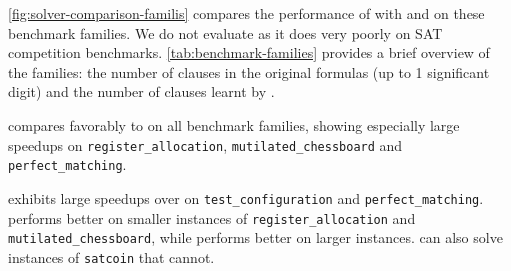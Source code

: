 \autoref{fig:solver-comparison-familis} compares the performance of \tool with
\cadical and \prelearn on these benchmark families. We do not evaluate \sadical
as it does very poorly on SAT competition benchmarks.
\autoref{tab:benchmark-families} provides a brief overview of the families: the
number of clauses in the original formulas (up to 1 significant digit) and the
number of \pr clauses learnt by \tool.

\tool compares favorably to \cadical on all benchmark families, showing especially large speedups on
\texttt{register\_allocation}, \texttt{mutilated\_chessboard} and
\texttt{perfect\_matching}. 

\prelearn exhibits large speedups over \tool on \texttt{test\_configuration} and
\texttt{perfect\_matching}. \tool performs better on smaller instances of
\texttt{register\_allocation} and \texttt{mutilated\_chessboard}, while
\prelearn performs better on larger instances. \tool can also solve instances of
\texttt{satcoin} that \prelearn cannot.





















